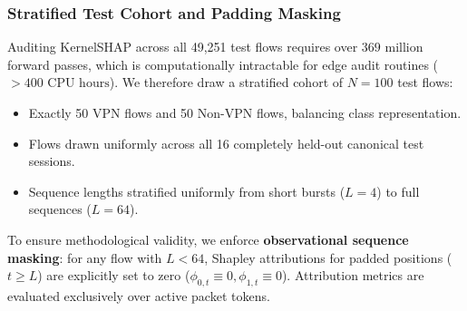 \documentclass[conference]{IEEEtran}
\begin{document}
\subsubsection{Stratified Test Cohort and Padding Masking}
Auditing KernelSHAP across all 49,251 test flows requires over $369\text{ million}$ forward passes, which is computationally intractable for edge audit routines ($> 400\text{ CPU hours}$). We therefore draw a stratified cohort of $N = 100$ test flows:
\begin{itemize}
    \item Exactly 50 VPN flows and 50 Non-VPN flows, balancing class representation.
    \item Flows drawn uniformly across all 16 completely held-out canonical test sessions.
    \item Sequence lengths stratified uniformly from short bursts ($L = 4$) to full sequences ($L = 64$).
\end{itemize}
To ensure methodological validity, we enforce \textbf{observational sequence masking}: for any flow with $L < 64$, Shapley attributions for padded positions ($t \ge L$) are explicitly set to zero ($\phi_{0, t} \equiv 0, \phi_{1, t} \equiv 0$). Attribution metrics are evaluated exclusively over active packet tokens.
\end{document}

